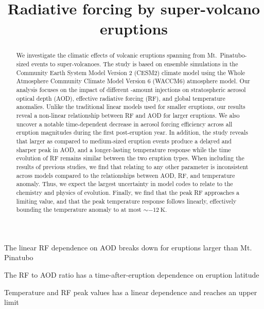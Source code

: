 \documentclass[draft]{agujournal2019}
\begin{document}

  \title{Radiative forcing by super-volcano eruptions}





  \begin{keypoints}
    \item
    The linear RF dependence on AOD breaks down for eruptions larger than Mt. Pinatubo
    \item
    The RF to AOD ratio has a time-after-eruption dependence on eruption latitude
    \item
    Temperature and RF peak values has a linear dependence and reaches an upper limit
  \end{keypoints}

  \begin{abstract}
    We investigate the climatic effects of volcanic eruptions spanning from Mt.\
    Pinatubo-sized events to super-volcanoes. The study is based on ensemble simulations
    in the Community Earth System Model Version 2 (CESM2) climate model using the Whole
    Atmosphere Community Climate Model Version 6 (WACCM6) atmosphere model. Our analysis
    focuses on the impact of different \ce{SO2}-amount injections on stratospheric
    aerosol optical depth (AOD), effective radiative forcing (RF), and global
    temperature anomalies. Unlike the traditional linear models used for smaller
    eruptions, our results reveal a non-linear relationship between RF and AOD for
    larger eruptions. We also uncover a notable time-dependent decrease in aerosol
    forcing efficiency across all eruption magnitudes during the first post-eruption
    year. In addition, the study reveals that larger as compared to medium-sized
    eruption events produce a delayed and sharper peak in AOD, and a longer-lasting
    temperature response while the time evolution of RF remains similar between the two
    eruption types. When including the results of previous studies, we find that
    relating \ce{SO2} to any other parameter is inconsistent across models compared to
    the relationships between AOD, RF, and temperature anomaly. Thus, we expect the
    largest uncertainty in model codes to relate to the chemistry and physics of
    \ce{SO2} evolution. Finally, we find that the peak RF approaches a limiting value,
    and that the peak temperature response follows linearly, effectively bounding the
    temperature anomaly to at most \(\sim\SI{-12}{\kelvin}\).
  \end{abstract}
\end{document}
